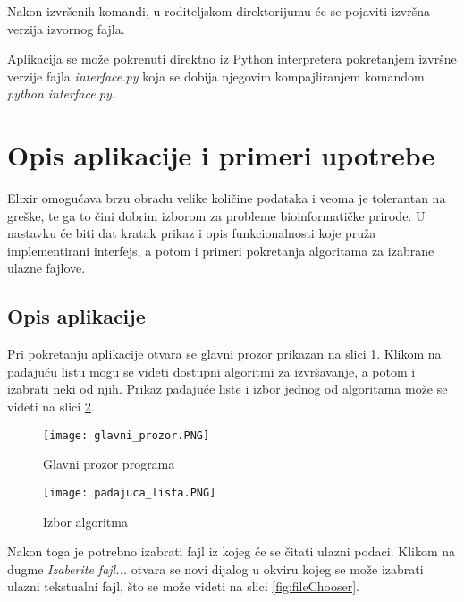 \documentclass[12pt,oneside]{memoir}
\begin{document}
\noindent Nakon izvršenih komandi, u roditeljskom direktorijumu će se pojaviti izvršna verzija izvornog fajla.

\begin{minipage}{\linewidth}

\end{minipage}

Aplikacija se može pokrenuti direktno iz Python interpretera pokretanjem izvršne verzije fajla \textit{interface.py} koja se dobija njegovim kompajliranjem komandom \textit{python interface.py}.

\section{Opis aplikacije i primeri upotrebe}
\label{odeljak:OpisPrimeriUpotrebe}

Elixir omogućava brzu obradu velike količine podataka i veoma je tolerantan na greške, te ga to čini dobrim izborom za probleme bioinformatičke prirode. U nastavku će biti dat kratak prikaz i opis funkcionalnosti koje pruža implementirani interfejs, a potom i primeri pokretanja algoritama za izabrane ulazne fajlove.

\subsection{Opis aplikacije}

Pri pokretanju aplikacije otvara se glavni prozor prikazan na slici \ref{fig:glavniProzor}. Klikom na padajuću listu mogu se videti dostupni algoritmi za izvršavanje, a potom i izabrati neki od njih. Prikaz padajuće liste i izbor jednog od algoritama može se videti na slici \ref{fig:padajucaLista}. 

\begin{figure}[h]
\centering
\texttt{[image: glavni\_prozor.PNG]}
\caption{Glavni prozor programa}
\label{fig:glavniProzor}
\end{figure}

\begin{figure}[h]
\centering
\texttt{[image: padajuca\_lista.PNG]}
\caption{Izbor algoritma}
\label{fig:padajucaLista}
\end{figure}

Nakon toga je potrebno izabrati fajl iz kojeg će se čitati ulazni podaci. Klikom na dugme \textit{Izaberite fajl...} otvara se novi dijalog u okviru kojeg se može izabrati ulazni tekstualni fajl, što se može videti na slici \ref{fig:fileChooser}.
\end{document}
